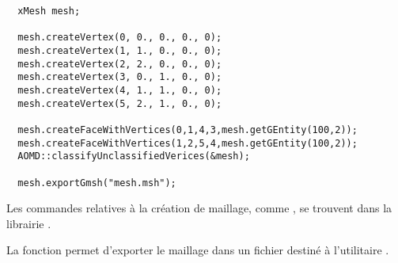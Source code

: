 \begin{verbatim}
  xMesh mesh;

  mesh.createVertex(0, 0., 0., 0., 0);
  mesh.createVertex(1, 1., 0., 0., 0);
  mesh.createVertex(2, 2., 0., 0., 0);
  mesh.createVertex(3, 0., 1., 0., 0);
  mesh.createVertex(4, 1., 1., 0., 0);
  mesh.createVertex(5, 2., 1., 0., 0);

  mesh.createFaceWithVertices(0,1,4,3,mesh.getGEntity(100,2));
  mesh.createFaceWithVertices(1,2,5,4,mesh.getGEntity(100,2));
  AOMD::classifyUnclassifiedVerices(&mesh);

  mesh.exportGmsh("mesh.msh");
\end{verbatim}

 Les commandes relatives \`a la cr\'eation de maillage,
comme , se trouvent dans la librairie
. 

La fonction  permet d'exporter le   maillage
dans un fichier destin\'e \`a l'utilitaire .
